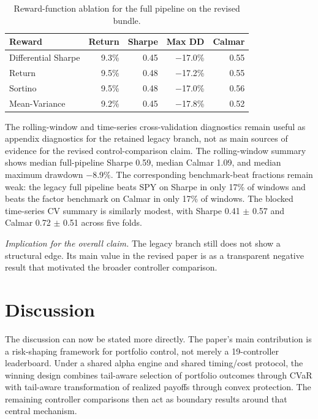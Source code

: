 \documentclass[10pt,twocolumn]{article}
\begin{document}
\begin{table}[t]
\centering
\small
\caption{Reward-function ablation for the full pipeline on the revised bundle.}
\label{tab:reward_ablation}
\begin{tabular}{@{} l r r r r @{}}
\toprule
\textbf{Reward} & \textbf{Return} & \textbf{Sharpe} & \textbf{Max DD} & \textbf{Calmar} \\
\midrule
Differential Sharpe & 9.3\% & 0.45 & $-$17.0\% & 0.55 \\
Return              & 9.5\% & 0.48 & $-$17.2\% & 0.55 \\
Sortino             & 9.5\% & 0.48 & $-$17.0\% & 0.56 \\
Mean-Variance       & 9.2\% & 0.45 & $-$17.8\% & 0.52 \\
\bottomrule
\end{tabular}
\end{table}

The rolling-window and time-series cross-validation diagnostics remain useful as appendix diagnostics for the retained legacy branch, not as main sources of evidence for the revised control-comparison claim. The rolling-window summary
shows median full-pipeline Sharpe 0.59, median Calmar 1.09, and median maximum
drawdown $-$8.9\%. The corresponding benchmark-beat fractions remain weak:
the legacy full pipeline beats SPY on Sharpe in only 17\% of windows and beats
the factor benchmark on Calmar in only 17\% of windows. The blocked time-series
CV summary is similarly modest, with Sharpe 0.41 $\pm$ 0.57 and Calmar
0.72 $\pm$ 0.51 across five folds.

\noindent\textit{Implication for the overall claim.} The legacy branch still
does not show a structural edge. Its main value in the revised paper is as a
transparent negative result that motivated the broader controller comparison.


\section{Discussion}

The discussion can now be stated more directly. The paper's main contribution is a risk-shaping framework for portfolio control, not merely a 19-controller leaderboard. Under a shared alpha engine and shared timing/cost protocol, the winning design combines tail-aware selection of portfolio outcomes through CVaR with tail-aware transformation of realized payoffs through convex protection. The remaining controller comparisons then act as boundary results around that central mechanism.
\end{document}
